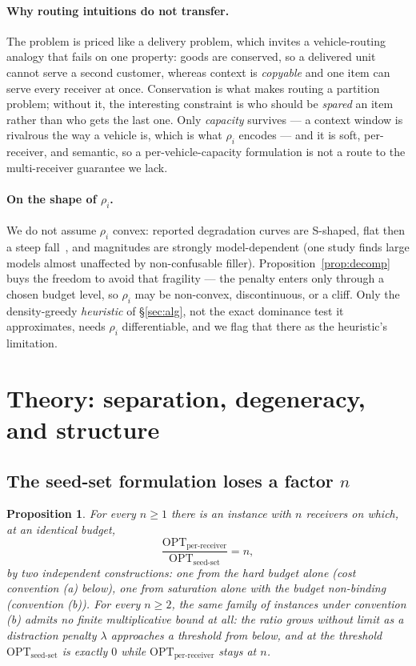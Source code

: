 \documentclass[sigconf,anonymous]{aamas}
\newtheorem{proposition}{Proposition}
\theoremstyle{remark}
\begin{document}
\paragraph{Why routing intuitions do not transfer.} The problem is
priced like a delivery problem, which invites a vehicle-routing
analogy that fails on one property: goods are conserved, so a
delivered unit cannot serve a second customer, whereas context is
\emph{copyable} and one item can serve every receiver at once.
Conservation is what makes routing a partition problem; without it,
the interesting constraint is who should be \emph{spared} an item
rather than who gets the last one. Only \emph{capacity} survives ---
a context window is rivalrous the way a vehicle is, which is what
$\rho_i$ encodes --- and it is soft, per-receiver, and semantic, so a
per-vehicle-capacity formulation is not a route to the multi-receiver
guarantee we lack.

\paragraph{On the shape of $\rho_i$.} We do not assume $\rho_i$
convex: reported degradation curves are S-shaped, flat then a steep
fall~\cite{nolima2025,liu2024}, and magnitudes are strongly
model-dependent (one study finds large models almost unaffected by
non-confusable filler). Proposition~\ref{prop:decomp} buys the
freedom to avoid that fragility --- the penalty enters only through a
chosen budget level, so $\rho_i$ may be non-convex, discontinuous, or
a cliff. Only the density-greedy \emph{heuristic} of \S\ref{sec:alg},
not the exact dominance test it approximates, needs $\rho_i$
differentiable, and we flag that there as the heuristic's limitation.

\section{Theory: separation, degeneracy, and structure}
\subsection{The seed-set formulation loses a factor $n$}
\label{sec:sep}

\begin{proposition}
\label{prop:sep}
For every $n \ge 1$ there is an instance with $n$ receivers on which,
at an identical budget,
\[
\frac{\mathrm{OPT}_{\text{per-receiver}}}{\mathrm{OPT}_{\text{seed-set}}} = n ,
\]
by two independent constructions: one from the hard budget alone
(cost convention (a) below), one from saturation alone with the
budget non-binding (convention (b)). For every $n \ge 2$, the same
family of instances under convention (b) admits no finite
multiplicative bound at all: the ratio grows without limit as a
distraction penalty $\lambda$ approaches a threshold from below, and
at the threshold $\mathrm{OPT}_{\text{seed-set}}$ is exactly $0$ while
$\mathrm{OPT}_{\text{per-receiver}}$ stays at $n$.
\end{proposition}
\end{document}
